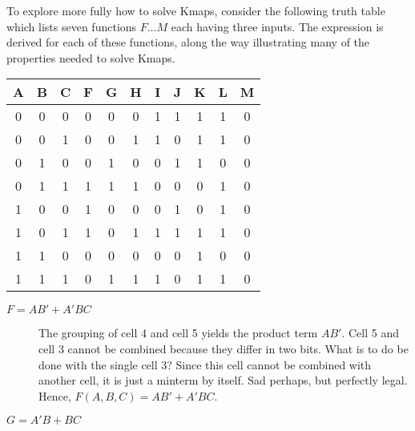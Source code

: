 \marginparsep=-1cm
\begin{changemargin}{1.5cm}{1.5cm}

To explore more fully how to solve Kmaps, consider the
following truth table which lists seven functions $F \ldots M$ 
each having three inputs.  The \SOPmin expression is derived 
for each of these functions, along the way 
illustrating many of the properties needed to solve Kmaps.

\begin{tabular}{c|c|c||c|c|c|c|c|c|c|c}
A & B & C & F & G & H & I & J & K & L & M  \\ \hline
0 & 0 & 0 & 0 & 0 & 0 & 1 & 1 & 1 & 1 & 0  \\ \hline
0 & 0 & 1 & 0 & 0 & 1 & 1 & 0 & 1 & 1 & 0  \\ \hline
0 & 1 & 0 & 0 & 1 & 0 & 0 & 1 & 1 & 0 & 0  \\ \hline
0 & 1 & 1 & 1 & 1 & 1 & 0 & 0 & 0 & 1 & 0  \\ \hline
1 & 0 & 0 & 1 & 0 & 0 & 0 & 1 & 0 & 1 & 0  \\ \hline
1 & 0 & 1 & 1 & 0 & 1 & 1 & 1 & 1 & 1 & 0  \\ \hline
1 & 1 & 0 & 0 & 0 & 0 & 0 & 0 & 1 & 0 & 0  \\ \hline
1 & 1 & 1 & 0 & 1 & 1 & 1 & 0 & 1 & 1 & 0  
\end{tabular}

\begin{description}
\item [$F= AB' + A'BC$]
The grouping of cell 4 and cell 5 yields the product term $AB'$.  
Cell 5 and cell 3 cannot be combined because they differ in two bits.
What is to do be done with the single cell 3?  Since this cell 
cannot be combined
with another cell, it is just a minterm by itself.  Sad perhaps, 
but perfectly legal.  Hence, $F(A,B,C) = AB' + A'BC$.

\item [$G=A'B + BC$]


\end{description}
\end{changemargin}
